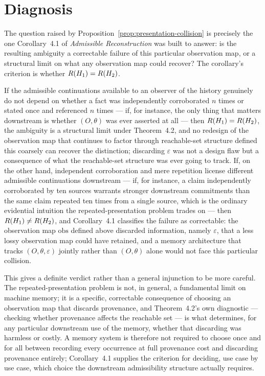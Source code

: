 \section{Diagnosis}

The question raised by Proposition~\ref{prop:presentation-collision} is precisely the one Corollary~4.1 of \emph{Admissible Reconstruction} was built to answer: is the resulting ambiguity a correctable failure of this particular observation map, or a structural limit on what any observation map could recover? The corollary's criterion is whether $R(H_1) = R(H_2)$.

If the admissible continuations available to an observer of the history genuinely do not depend on whether a fact was independently corroborated $n$ times or stated once and referenced $n$ times --- if, for instance, the only thing that matters downstream is whether $(O,\theta)$ was ever asserted at all --- then $R(H_1) = R(H_2)$, the ambiguity is a structural limit under Theorem~4.2, and no redesign of the observation map that continues to factor through reachable-set structure defined this coarsely can recover the distinction; discarding $\varepsilon$ was not a design flaw but a consequence of what the reachable-set structure was ever going to track. If, on the other hand, independent corroboration and mere repetition license different admissible continuations downstream --- if, for instance, a claim independently corroborated by ten sources warrants stronger downstream commitments than the same claim repeated ten times from a single source, which is the ordinary evidential intuition the repeated-presentation problem trades on --- then $R(H_1) \neq R(H_2)$, and Corollary~4.1 classifies the failure as correctable: the observation map $\mathrm{obs}$ defined above discarded information, namely $\varepsilon$, that a less lossy observation map could have retained, and a memory architecture that tracks $(O, \theta, \varepsilon)$ jointly rather than $(O,\theta)$ alone would not face this particular collision.

This gives a definite verdict rather than a general injunction to be more careful. The repeated-presentation problem is not, in general, a fundamental limit on machine memory; it is a specific, correctable consequence of choosing an observation map that discards provenance, and Theorem~4.2's own diagnostic --- checking whether provenance affects the reachable set --- is what determines, for any particular downstream use of the memory, whether that discarding was harmless or costly. A memory system is therefore not required to choose once and for all between recording every occurrence at full provenance cost and discarding provenance entirely; Corollary~4.1 supplies the criterion for deciding, use case by use case, which choice the downstream admissibility structure actually requires.
